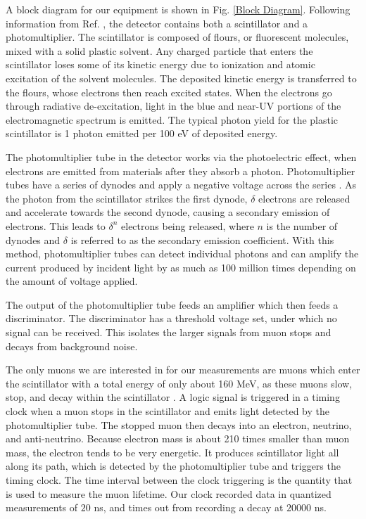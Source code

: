\documentclass[11pt,letterpaper]{article}
\begin{document}
A block diagram for our equipment is shown in Fig. \ref{Block Diagram}. Following information from Ref. \cite{Coan}, the detector contains both a scintillator and a photomultiplier. The scintillator is composed of flours, or fluorescent molecules, mixed with a solid plastic solvent. Any charged particle that enters the scintillator loses some of its kinetic energy due to ionization and atomic excitation of the solvent molecules. The deposited kinetic energy is transferred to the flours, whose electrons then reach excited states. When the electrons go through radiative de-excitation, light in the blue and near-UV portions of the electromagnetic spectrum is emitted. The typical photon yield for the plastic scintillator is 1 photon emitted per 100 eV of deposited energy.

The photomultiplier tube in the detector works via the photoelectric effect, when electrons are emitted from materials after they absorb a photon. Photomultiplier tubes have a series of dynodes and apply a negative voltage across the series \cite{Shimadzu}. As the photon from the scintillator strikes the first dynode, $\delta$ electrons are released and accelerate towards the second dynode, causing a secondary emission of electrons. This leads to $\delta^n$ electrons being released, where $n$ is the number of dynodes and $\delta$ is referred to as the secondary emission coefficient. With this method, photomultiplier tubes can detect individual photons and can amplify the current produced by incident light by as much as 100 million times depending on the amount of voltage applied.

The output of the photomultiplier tube feeds an amplifier which then feeds a discriminator. The discriminator has a threshold voltage set, under which no signal can be received. This isolates the larger signals from muon stops and decays from background noise.

The only muons we are interested in for our measurements are muons which enter the scintillator with a total energy of only about 160 MeV, as these muons slow, stop, and decay within the scintillator \cite{Coan}. A logic signal is triggered in a timing clock when a muon stops in the scintillator and emits light detected by the photomultiplier tube. The stopped muon then decays into an electron, neutrino, and anti-neutrino. Because electron mass is about 210 times smaller than muon mass, the electron tends to be very energetic. It produces scintillator light all along its path, which is detected by the photomultiplier tube and triggers the timing clock. The time interval between the clock triggering is the quantity that is used to measure the muon lifetime. Our clock recorded data in quantized measurements of $20$ ns, and times out from recording a decay at $20000$ ns.
\end{document}
